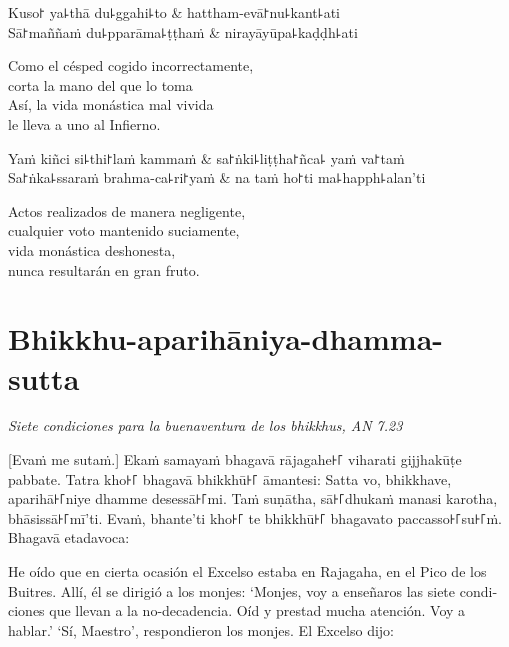 \begin{twochants}
	Kuso꜓ ya꜕thā du꜕ggahi꜕to & hattham-evā꜓nu꜕kant꜕ati \\
	Sā꜓maññaṁ du꜕pparāma꜕ṭṭhaṁ & nirayāyūpa꜕kaḍḍh꜕ati \\
\end{twochants}

\begin{english}
	Como el césped cogido incorrectamente,\\
	corta la mano del que lo toma\\
	Así, la vida monástica mal vivida\\
	le lleva a uno al Infierno.
\end{english}

\begin{twochants}
	Yaṁ kiñci si꜕thi꜓laṁ kammaṁ & sa꜓ṅki꜕liṭṭha꜓ñca꜕ yaṁ va꜓taṁ \\
	Sa꜓ṅka꜕ssaraṁ brahma-ca꜕ri꜓yaṁ & na taṁ ho꜓ti ma꜕happh꜕alan'ti \\
\end{twochants}

\begin{english}
	Actos realizados de manera negligente,\\
	cualquier voto mantenido suciamente,\\
	vida monástica deshonesta,\\
	nunca resultarán en gran fruto.
\end{english}

\chapter[Aparihāniya-dhamma-sutta]{Bhikkhu-aparihāniya-dhamma-sutta}

\emph{Siete condiciones para la buenaventura de los bhikkhus, AN 7.23}

\begin{leader}
\end{leader}

[Evaṁ me sutaṁ.] Ekaṁ samayaṁ bhagavā rājagahe꜔꜒ viharati gijjhakūṭe pabbate.
Tatra kho꜔꜒ bhagavā bhikkhū꜔꜒ āmantesi: Satta vo, bhikkhave, aparihā꜔꜒niye dhamme
desessā꜔꜒mi. Taṁ suṇātha, sā꜔꜒dhukaṁ manasi karotha, bhāsissā꜔꜒mī'ti. Evaṁ, bhante'ti
kho꜔꜒ te bhikkhū꜔꜒ bhagavato paccasso꜔꜒su꜔꜒ṁ. Bhagavā etadavoca:

\begin{english}
  He oído que en cierta ocasión el Excelso estaba en Rajagaha, en el Pico de los Buitres. Allí, él se dirigió a los monjes: ‘Monjes, voy a enseñaros las siete condiciones que llevan a la no-decadencia. Oíd y prestad mucha atención. Voy a hablar.’ ‘Sí, Maestro’, respondieron los monjes. El Excelso dijo:
\end{english}

